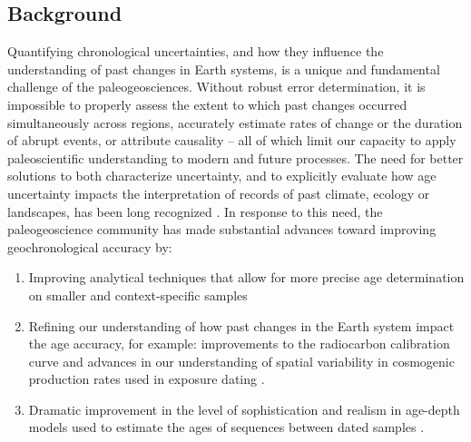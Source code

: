 \documentclass[gchron, manuscript]{copernicus}
\begin{document}


\introduction

\subsection{Background}

Quantifying chronological uncertainties, and how they influence the understanding of past changes in Earth systems, is a unique and fundamental challenge of the paleogeosciences.
Without robust error determination, it is impossible to properly assess the extent to which past changes occurred simultaneously across regions, accurately estimate rates of change or the duration of abrupt events, or attribute causality -- all of which limit our capacity to apply paleoscientific understanding to modern and future processes.
The need for better solutions to both characterize uncertainty, and to explicitly evaluate how age uncertainty impacts the interpretation of records of past climate, ecology or landscapes, has been long recognized \citep{Noren2013, NASEM_CORES_2020}.
In response to this need, the paleogeoscience community has made substantial advances toward improving geochronological accuracy by:

\begin{enumerate}
\def\labelenumi{\arabic{enumi}.}
\item
  Improving analytical techniques that allow for more precise age determination on smaller and context-specific samples \citep{Brown_radiocarbon89, Eglinton96, Fifield2000, Eggins2005, Santos_blank_2010}
\item
  Refining our understanding of how past changes in the Earth system impact the age accuracy, for example: improvements to the radiocarbon calibration curve \citep{Reimer09, intcal13, intcal20} and advances in our understanding of spatial variability in cosmogenic production rates used in exposure dating \citep{Balco2009, Masarik2009}.
\item
  Dramatic improvement in the level of sophistication and realism in age-depth models used to estimate the ages of sequences between dated samples \citep[e.g.][]{Ramsey2009Bayesian, parnell2008flexible, Blaauw2010CLAM, Blaauw2011BACON}.
\end{enumerate}
\end{document}
